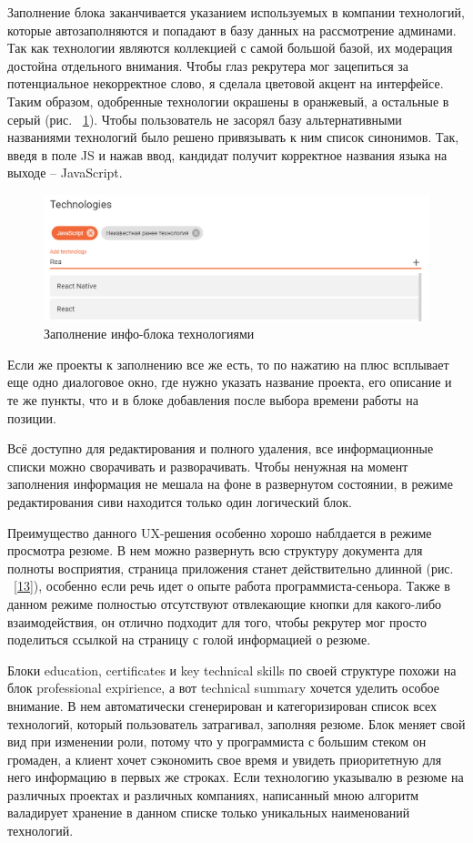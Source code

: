 \documentclass[a4paper,12pt]{diplom}
\begin{document}
Заполнение блока заканчивается указанием используемых в компании технологий, которые автозаполняются и попадают в базу данных на рассмотрение админами.
Так как технологии являются коллекцией с самой большой базой, их модерация достойна отдельного внимания. Чтобы глаз рекрутера мог зацепиться за потенциальное некорректное слово, я 
сделала цветовой акцент на интерфейсе. Таким образом, одобренные технологии окрашены в оранжевый, а остальные в серый (рис. ~\ref{12}). Чтобы пользователь не засорял базу альтернативными названиями технологий было решено привязывать к ним список синонимов. Так, введя в поле JS и нажав ввод,
кандидат получит корректное названия языка на выходе -- JavaScript.

\begin{figure}[!ht]
	\centering
	\includegraphics[width=1\textwidth]{resources/technologies.png}
	\caption{Заполнение инфо-блока технологиями}
	\label{12}
\end{figure}

Если же проекты к заполнению все же есть, то по нажатию на плюс всплывает еще одно диалоговое окно, где нужно
указать название проекта, его описание и те же пункты, что и в блоке добавления после выбора времени работы на позиции.

Всё доступно для редактирования и полного удаления, все информационные списки можно сворачивать и разворачивать. Чтобы ненужная на момент заполнения информация не мешала на фоне в развернутом состоянии, в режиме редактирования сиви находится 
только один логический блок.

Преимущество данного UX-решения особенно хорошо наблдается в режиме просмотра резюме. В нем можно развернуть всю структуру документа для полноты восприятия, страница приложения станет действительно длинной (рис. ~\ref{13}), особенно если речь идет о опыте работа программиста-сеньора.
Также в данном режиме полностью отсутствуют отвлекающие кнопки для какого-либо взаимодействия, он отлично подходит для того, чтобы рекрутер мог просто поделиться ссылкой на страницу с голой информацией о резюме.

Блоки education, certificates и key technical skills по своей структуре похожи на блок professional expirience, а вот technical summary хочется уделить особое внимание.
В нем автоматически сгенерирован и категоризирован список всех технологий, который пользователь затрагивал, заполняя резюме. Блок меняет свой вид при изменении роли, потому что у программиста с большим стеком он
громаден, а клиент хочет сэкономить свое время и увидеть приоритетную для него информацию в первых же строках. Если технологию указывалю в резюме на различных проектах и различных компаниях, написанный мною алгоритм валадирует хранение в данном списке только уникальных наименований технологий.
\end{document}
